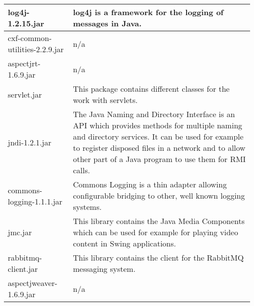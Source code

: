 \begin{center}
\begin{longtable}{|p{}|p{}|}
\hline 
log4j-1.2.15.jar & log4j is a framework for the logging of messages in Java.\\
\hline 
cxf-common-utilities-2.2.9.jar & n/a\\
\hline 
aspectjrt-1.6.9.jar & n/a\\
\hline 
servlet.jar & This package contains different classes for the work with servlets.\\
\hline 
jndi-1.2.1.jar & The Java Naming and Directory Interface is an API which provides methods for multiple naming and directory services. It can be used for example to register disposed files in a network and to allow other part of a Java program to use them for RMI calls.\\
\hline 
commons-logging-1.1.1.jar & Commons Logging is a thin adapter allowing configurable bridging to other, well known logging systems.\\
\hline 
jmc.jar & This library contains the Java Media Components which can be used for example for playing video content in Swing applications.\\
\hline 
rabbitmq-client.jar & This library contains the client for the RabbitMQ messaging system.\\
\hline 
aspectjweaver-1.6.9.jar & n/a\\
\hline 
\end{longtable}
\label{tabular:libraries}
\end{center}
